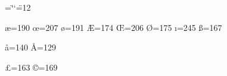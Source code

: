 

\chardef\dblcode=\catcode`\"	%
\catcode`\"=12			%







\chardef\ae=190	%
\chardef\oe=207 %
\chardef\o=191  %
\chardef\AE=174	%
\chardef\OE=206 %
\chardef\O=175  %
\chardef\i=245  %
\chardef\ss=167	%


\chardef\aa=140 \chardef\AA=129 %
\chardef{} \chardef{} %


\chardef\pounds=163 \chardef\copyright=169



\def\`#1{{\accent96 #1}}	%
\def\'#1{{\accent171 #1}}	%
\def\v#1{{\accent255 #1}}	%
\def\u#1{{\accent249 #1}}	%
\def\=#1{{\accent248 #1}}	%
\def\^#1{{\accent246 #1}}	%
\def\.#1{{\accent250 #1}}	%
\def\H#1{{\accent253 #1}}	%
\def\~#1{{\accent247 #1}}	%
\def\"#1{{\accent172 #1}}	%

